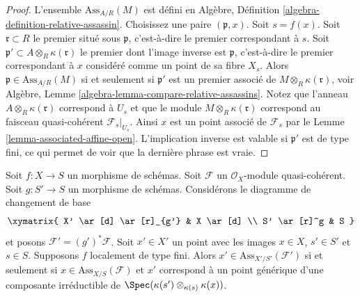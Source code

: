 \begin{proof}
L'ensemble  $\text{Ass}_{A/R}(M)$  est défini en Algèbre, Définition  \ref{algebra-definition-relative-assassin}. Choisissez
une paire  $(\mathfrak p, x)$. Soit  $s = f(x)$. Soit  $\mathfrak r \subset R$  le premier situé sous
 $\mathfrak p$, c'est-à-dire le premier correspondant à  $s$. Soit
 $\mathfrak p' \subset A \otimes_R \kappa(\mathfrak r)$  le premier dont l'image inverse est  $\mathfrak p$, c'est-à-dire le
premier correspondant à  $x$  considéré comme un point de sa fibre
 $X_s$. Alors  $\mathfrak p \in \text{Ass}_{A/R}(M)$  si et seulement si  $\mathfrak p'$  est un premier
associé de  $M \otimes_R \kappa(\mathfrak r)$, voir Algèbre, Lemme  \ref{algebra-lemma-compare-relative-assassins}. Notez que l'anneau
 $A \otimes_R \kappa(\mathfrak r)$  correspond à  $U_s$  et que le module  $M \otimes_R \kappa(\mathfrak r)$  correspond au
faisceau quasi-cohérent  $\mathcal{F}_s|_{U_s}$. Ainsi  $x$  est un point associé de
 $\mathcal{F}_s$  par le Lemme  \ref{lemma-associated-affine-open}. L'implication inverse est valable si
 $\mathfrak p'$  est de type fini, ce qui permet de voir que la dernière phrase est
vraie.
\end{proof}

\begin{lemma}
\label{lemma-base-change-relative-assassin}
Soit  $f : X \to S$  un morphisme de schémas. Soit  $\mathcal{F}$  un
 $\mathcal{O}_X$-module quasi-cohérent. Soit  $g : S' \to S$  un morphisme de schémas.
Considérons le diagramme de changement de base
$$
\xymatrix{
X' \ar[d] \ar[r]_{g'} & X \ar[d] \\
S' \ar[r]^g & S
}
$$
et posons  $\mathcal{F}' = (g')^*\mathcal{F}$. Soit  $x' \in X'$  un point avec les images  $x \in X$,
 $s' \in S'$  et  $s \in S$. Supposons  $f$  localement de type fini.
Alors  $x' \in \text{Ass}_{X'/S'}(\mathcal{F}')$  si et seulement si  $x \in \text{Ass}_{X/S}(\mathcal{F})$  et  $x'$  correspond à un
point générique d'une composante irréductible de  $\Spec(\kappa(s') \otimes_{\kappa(s)} \kappa(x))$.
\end{lemma}

